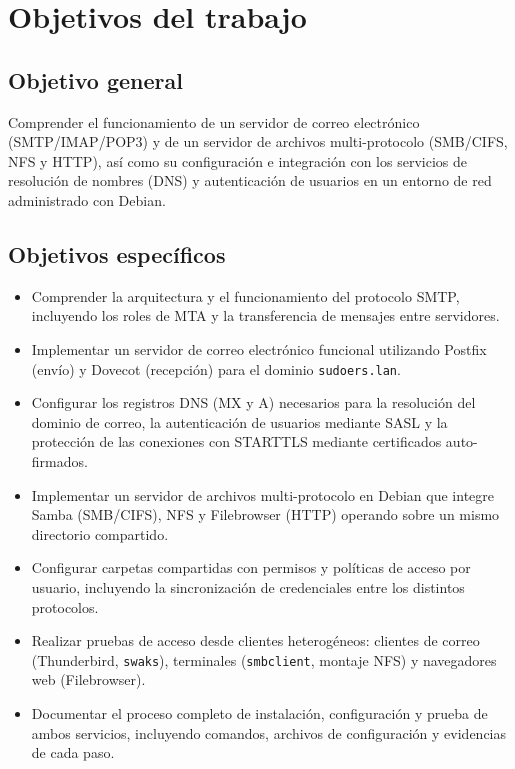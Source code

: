 
\section{Objetivos del trabajo}

\subsection{Objetivo general}

Comprender el funcionamiento de un servidor de correo electrónico
(SMTP/IMAP/POP3) y de un servidor de archivos multi-protocolo (SMB/CIFS, NFS y
HTTP), así como su configuración e integración con los servicios de resolución
de nombres (DNS) y autenticación de usuarios en un entorno de red administrado
con Debian.

\subsection{Objetivos específicos}

\begin{itemize}
  \item Comprender la arquitectura y el funcionamiento del protocolo SMTP,
        incluyendo los roles de MTA y la transferencia de mensajes entre
        servidores.
  \item Implementar un servidor de correo electrónico funcional utilizando
        Postfix (envío) y Dovecot (recepción) para el dominio
        \texttt{sudoers.lan}.
  \item Configurar los registros DNS (MX y A) necesarios para la resolución
        del dominio de correo, la autenticación de usuarios mediante SASL y la
        protección de las conexiones con STARTTLS mediante certificados
        auto-firmados.
  \item Implementar un servidor de archivos multi-protocolo en Debian que
        integre Samba (SMB/CIFS), NFS y Filebrowser (HTTP) operando sobre un
        mismo directorio compartido.
  \item Configurar carpetas compartidas con permisos y políticas de acceso por
        usuario, incluyendo la sincronización de credenciales entre los
        distintos protocolos.
  \item Realizar pruebas de acceso desde clientes heterogéneos: clientes de
        correo (Thunderbird, \texttt{swaks}), terminales (\texttt{smbclient},
        montaje NFS) y navegadores web (Filebrowser).
  \item Documentar el proceso completo de instalación, configuración y prueba
        de ambos servicios, incluyendo comandos, archivos de configuración y
        evidencias de cada paso.
\end{itemize}